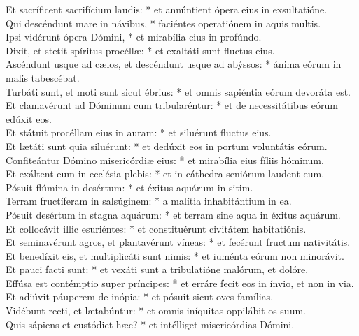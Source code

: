 {	Et sacríficent sacrifícium laudis: * et annúntient ópera eius in exsultatióne. \\
	Qui descéndunt mare in návibus, * faciéntes operatiónem in aquis multis. \\
	Ipsi vidérunt ópera Dómini, * et mirabília eius in profúndo. \\
	Dixit, et stetit spíritus procéllæ: * et exaltáti sunt fluctus eius. \\
	Ascéndunt usque ad cælos, et descéndunt usque ad abýssos: * ánima eórum in malis tabescébat. \\
	Turbáti sunt, et moti sunt sicut ébrius: * et omnis sapiéntia eórum devoráta est. \\
	Et clamavérunt ad Dóminum cum tribularéntur: * et de necessitátibus eórum edúxit eos. \\
	Et státuit procéllam eius in auram: * et siluérunt fluctus eius. \\
	Et lætáti sunt quia siluérunt: * et dedúxit eos in portum voluntátis eórum. \\
	Confiteántur Dómino misericórdiæ eius: * et mirabília eius fíliis hóminum. \\
	Et exáltent eum in ecclésia plebis: * et in cáthedra seniórum laudent eum. \\
	Pósuit flúmina in desértum: * et éxitus aquárum in sitim. \\
	Terram fructíferam in salsúginem: * a malítia inhabitántium in ea. \\
	Pósuit desértum in stagna aquárum: * et terram sine aqua in éxitus aquárum. \\
	Et collocávit illic esuriéntes: * et constituérunt civitátem habitatiónis. \\
	Et seminavérunt agros, et plantavérunt víneas: * et fecérunt fructum nativitátis. \\
	Et benedíxit eis, et multiplicáti sunt nimis: * et iuménta eórum non minorávit. \\
	Et pauci facti sunt: * et vexáti sunt a tribulatióne malórum, et dolóre. \\
	Effúsa est contémptio super príncipes: * et erráre fecit eos in ínvio, et non in via. \\
	Et adiúvit páuperem de inópia: * et pósuit sicut oves famílias. \\
	Vidébunt recti, et lætabúntur: * et omnis iníquitas oppilábit os suum. \\
	Quis sápiens et custódiet hæc? * et intélliget misericórdias Dómini.
}

